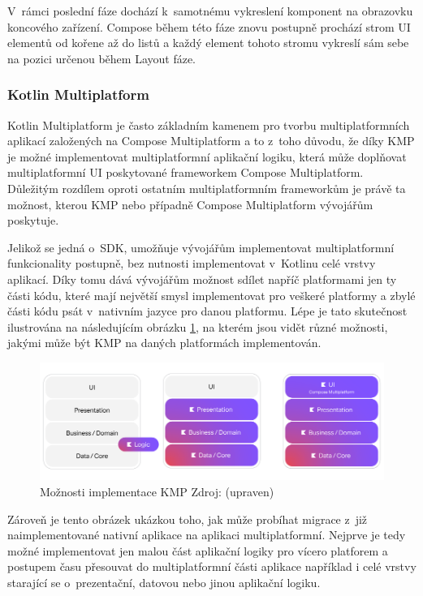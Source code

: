 V~rámci poslední fáze dochází k~samotnému vykreslení komponent na obrazovku koncového zařízení. \cite{jetpackPhases}
Compose během této fáze znovu postupně prochází strom UI elementů od kořene až do listů a každý element tohoto stromu vykreslí sám sebe 
na pozici určenou během Layout fáze. \cite{jetpackPhases}

\subsubsection{Kotlin Multiplatform} \label{kmpSection}



Kotlin Multiplatform je často základním kamenem pro tvorbu multiplatformních aplikací založených na Compose Multiplatform a to
z~toho důvodu, že díky KMP je možné implementovat multiplatformní aplikační logiku, která může doplňovat multiplatformní UI 
poskytované frameworkem Compose Multiplatform. \cite{KMPUseCases} Důležitým rozdílem oproti ostatním multiplatformním frameworkům 
je právě ta možnost, kterou KMP nebo případně Compose Multiplatform vývojářům poskytuje. 

Jelikož se jedná o~SDK, umožňuje vývojářům implementovat multiplatformní funkcionality postupně, bez nutnosti implementovat 
v~Kotlinu celé vrstvy aplikací. Díky tomu dává vývojářům možnost sdílet napříč platformami jen ty části kódu, které mají největší
smysl implementovat pro veškeré platformy a zbylé části kódu psát v~nativním jazyce pro danou platformu. \cite{KMP}
Lépe je tato skutečnost ilustrována na následujícím obrázku \ref{fig:KMP_vrstvy}, na kterém jsou vidět různé možnosti,
jakými může být KMP na daných platformách implementován.

\begin{figure}[H]
  \centering
  \includegraphics[width=.7\textwidth]{KMP_vrstvy.png}
  \caption{Možnosti implementace KMP Zdroj: \cite{KMPUseCases} (upraven)}
  \label{fig:KMP_vrstvy}
\end{figure}

Zároveň je tento obrázek ukázkou toho, jak může probíhat migrace z~již naimplementované nativní aplikace na aplikaci
multiplatformní. Nejprve je tedy možné implementovat jen malou část aplikační logiky pro vícero platforem a postupem času přesouvat
do multiplatformní části aplikace například i celé vrstvy starající se o~prezentační, datovou nebo jinou aplikační logiku. \cite{KMPUseCases}


